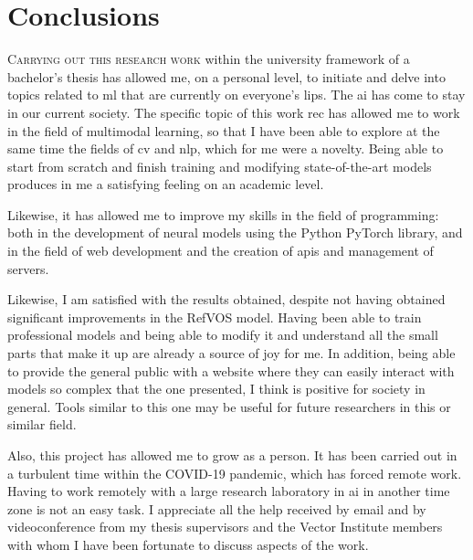 

\chapter{Conclusions}\label{cha:concl}



\lettrine{C}{arrying out this research work} within the university framework of
a bachelor's thesis has allowed me, on a personal level, to initiate and delve
into topics related to \gls{ml} that are currently on everyone's lips. The
\gls{ai} has come to stay in our current society. The specific topic of this
work \gls{rec} has allowed me to work in the field of multimodal learning, so
that I have been able to explore at the same time the fields of \gls{cv} and
\gls{nlp}, which for me were a novelty. Being able to start from scratch and
finish training and modifying state-of-the-art models produces in me a
satisfying feeling on an academic level.

Likewise, it has allowed me to improve my skills in the field of programming:
both in the development of neural models using the Python PyTorch library, and
in the field of web development and the creation of \glspl{api} and management
of servers.

Likewise, I am satisfied with the results obtained, despite not having obtained
significant improvements in the RefVOS model. Having been able to train
professional models and being able to modify it and understand all the small
parts that make it up are already a source of joy for me. In addition, being
able to provide the general public with a website where they can easily
interact with models so complex that the one presented, I think is positive for
society in general. Tools similar to this one may be useful for future
researchers in this or similar field.

Also, this project has allowed me to grow as a person. It has been carried out
in a turbulent time within the COVID-19 pandemic, which has forced remote
work. Having to work remotely with a large research laboratory in \gls{ai} in
another time zone is not an easy task. I appreciate all the help received by
email and by videoconference from my thesis supervisors and the Vector
Institute members with whom I have been fortunate to discuss aspects of the
work.



